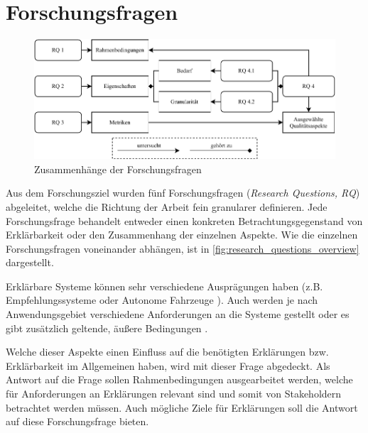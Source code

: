 \section{Forschungsfragen}

\begin{figure}[htb!]
    \includegraphics[width=\textwidth]{contents/03_research_design/res/research_questions_overview.pdf}
    \caption{Zusammenhänge der Forschungsfragen}
    \label{fig:research_questions_overview}
\end{figure}

Aus dem Forschungsziel wurden fünf Forschungsfragen (\textit{Research Questions, RQ}) abgeleitet, welche die Richtung der Arbeit fein granularer definieren. Jede Forschungsfrage behandelt entweder einen konkreten Betrachtungsgegenstand von Erklärbarkeit oder den Zusammenhang der einzelnen Aspekte. Wie die einzelnen Forschungsfragen voneinander abhängen, ist in \autoref{fig:research_questions_overview} dargestellt.

\smallskip

\noindent{}

\smallskip

Erklärbare Systeme können sehr verschiedene Ausprägungen haben (z.B. Empfehlungssysteme \cite{kunkel_let_2019} oder Autonome Fahrzeuge \cite{wiegand2019drive}). Auch werden je nach Anwendungsgebiet verschiedene Anforderungen an die Systeme gestellt oder es gibt zusätzlich geltende, äußere Bedingungen \cite{chazette_knowledge_nodate}.

Welche dieser Aspekte einen Einfluss auf die benötigten Erklärungen bzw. Erklärbarkeit im Allgemeinen haben, wird mit dieser Frage abgedeckt. Als Antwort auf die Frage sollen Rahmenbedingungen ausgearbeitet werden, welche für Anforderungen an Erklärungen relevant sind und somit von Stakeholdern betrachtet werden müssen. Auch mögliche Ziele für Erklärungen soll die Antwort auf diese Forschungsfrage bieten. 

